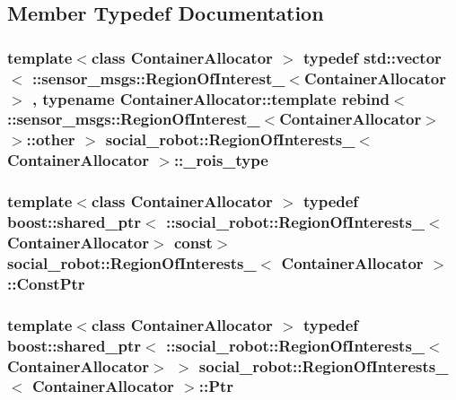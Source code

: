 \subsection{Member Typedef Documentation}
\hypertarget{structsocial__robot_1_1RegionOfInterests___aa1fccf0590660a07bacd76159ca8dc42}{
\subsubsection[{\_\-rois\_\-type}]{\setlength{\rightskip}{0pt plus 5cm}template$<$class ContainerAllocator $>$ typedef std::vector$<$ ::sensor\_\-msgs::RegionOfInterest\_\-$<$ContainerAllocator$>$ , typename ContainerAllocator::template rebind$<$ ::sensor\_\-msgs::RegionOfInterest\_\-$<$ContainerAllocator$>$ $>$::other $>$ {\bf social\_\-robot::RegionOfInterests\_\-}$<$ ContainerAllocator $>$::{\bf \_\-rois\_\-type}}}
\label{structsocial__robot_1_1RegionOfInterests___aa1fccf0590660a07bacd76159ca8dc42}
\hypertarget{structsocial__robot_1_1RegionOfInterests___ae75b9b0cb5dd5c60b34d9e0890994385}{
\subsubsection[{ConstPtr}]{\setlength{\rightskip}{0pt plus 5cm}template$<$class ContainerAllocator $>$ typedef boost::shared\_\-ptr$<$ ::{\bf social\_\-robot::RegionOfInterests\_\-}$<$ContainerAllocator$>$ const$>$ {\bf social\_\-robot::RegionOfInterests\_\-}$<$ ContainerAllocator $>$::{\bf ConstPtr}}}
\label{structsocial__robot_1_1RegionOfInterests___ae75b9b0cb5dd5c60b34d9e0890994385}
\hypertarget{structsocial__robot_1_1RegionOfInterests___affa13225dd210fc9f022418ff1a77c44}{
\subsubsection[{Ptr}]{\setlength{\rightskip}{0pt plus 5cm}template$<$class ContainerAllocator $>$ typedef boost::shared\_\-ptr$<$ ::{\bf social\_\-robot::RegionOfInterests\_\-}$<$ContainerAllocator$>$ $>$ {\bf social\_\-robot::RegionOfInterests\_\-}$<$ ContainerAllocator $>$::{\bf Ptr}}}
